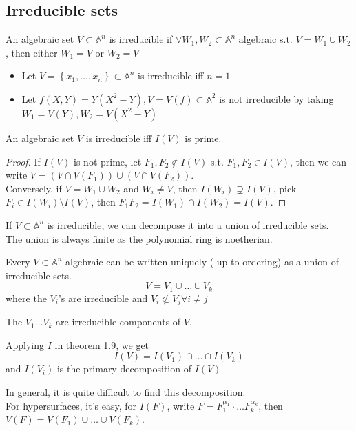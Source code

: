 \documentclass[../main.tex]{subfiles}
\begin{document}
\subsection{Irreducible sets}
\begin{defn}
	An algebraic set $V \subset \mathbb{A}^{n}$ is irreducible if $\forall W_1,W_2\subset \mathbb{A}^{n}$ algebraic s.t. $ V = W_1\cup W_2$, then either $W_1=V$ or $W_2=V$ 	 
\end{defn}
\begin{exemple}
	\begin{itemize}
	\item Let $V = \left\{ x_1,\ldots,x_n \right\} \subset \mathbb{A}^{n}$ is irreducible iff $n=1$  
	\item Let $f( X,Y) = Y( X^{2}-Y) , V=V( f) \subset \mathbb{A}^{2}$ is not irreducible by taking $W_1= V( Y) ,W_2= V( X^{2}-Y) $ 	
	\end{itemize}
\end{exemple}
\begin{propo}
An algebraic set $V$ is irreducible iff $I( V) $ is prime.
\end{propo}
\begin{proof}
If $I( V) $ is not prime, let $F_1,F_2\notin I( V) $ s.t. $F_1,F_2\in I( V) $, then we can write $V= ( V\cap V( F_1) ) \cup ( V\cap V( F_2) ) $.\\
Conversely, if $V= W_1\cup W_2$ and $W_i\neq V$, then $I( W_i) \supsetneq I( V)$, pick $F_i\in I( W_i) \setminus I( V) $, then $F_1F_2= I( W_1) \cap I( W_2) = I( V) $.
\end{proof}
If $V \subset \mathbb{A}^{n}$ is irreducible, we can decompose it into a union of irreducible sets.\\
The union is always finite as the polynomial ring is noetherian.
\begin{thm}
	Every $V \subset \mathbb{A}^{n}$ algebraic can be written uniquely ( up to ordering) as a union of irreducible sets.
	\[ 
	V= V_1\cup\ldots\cup V_k
	\]
	where the $V_i$'s are irreducible and $V_i \not \subset V_j\forall i\neq j$ 
			
\end{thm}
\begin{defn}
	The $V_1\ldots V_k$ are irreducible components of $V$.
\end{defn}
\begin{rmq}
Applying $I$ in theorem 1.9, we get
\[ 
I( V) = I( V_1) \cap\ldots \cap I( V_k) 
\]
and $I( V_i) $ is the primary decomposition of $I( V) $ 
\end{rmq}
In general, it is quite difficult to find this decomposition.\\
For hypersurfaces, it's easy, for $I( F)$, write $F= F_1^{\alpha_1}\cdot\ldots F_k^{\alpha_k}$, then $V( F) = V( F_1) \cup\ldots\cup V( F_k) $.\\
\end{document}
